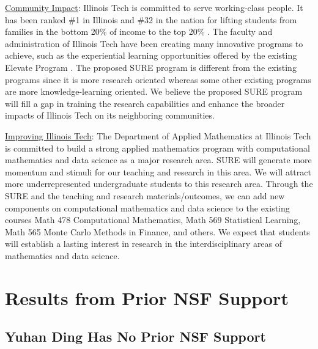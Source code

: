 \documentclass[11pt]{NSFamsart}
\newcommand{\Upara}[1]{\noindent\underline{\upshape #1}:}
\begin{document}
\Upara{Community Impact}
Illinois Tech is committed to serve working-class people. 
It has been ranked \#1 in Illinois and \#32 in the nation for lifting students from families in the bottom 20\% of income to the top 20\% \cite{IITrank}. 
The faculty and administration of Illinois Tech have been creating many innovative programs to achieve, such as the experiential learning opportunities offered by the existing Elevate Program \cite{IITElevate}.
The proposed SURE program is different from the existing programs since it is more research oriented whereas some other existing programs are more knowledge-learning oriented. 
We believe the proposed SURE program will fill a gap in training the research capabilities and enhance the broader impacts of Illinois Tech on its neighboring communities. 



\Upara{Improving Illinois Tech}
The Department of Applied Mathematics at Illinois Tech is committed to build a strong applied mathematics program with computational mathematics and data science as a major research area. 
SURE will generate more momentum and stimuli for our teaching and research in this area. We will attract more underrepresented undergraduate students to this research area. Through the SURE and the teaching and research materials/outcomes, we can add new components on computational mathematics and data science to the existing courses Math 478 Computational Mathematics, Math 569 Statistical Learning, Math 565 Monte Carlo Methods in Finance, and others.
We expect that students will establish a lasting interest in research in the interdisciplinary areas of mathematics and data science.



\section{Results from Prior NSF Support} \label{sec:prior_work}

\subsection{Yuhan Ding Has No Prior NSF Support}
\end{document}
